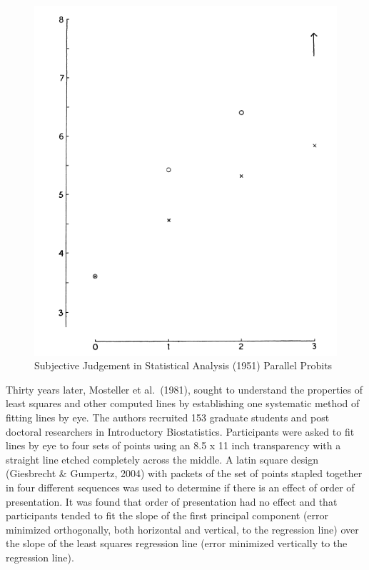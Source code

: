 \documentclass[print]{nuthesis}
\begin{document}
\begin{figure}[tbp]

{\centering \includegraphics[width=0.5\linewidth,]{images/subjective-judgement-plot} 

}

\caption{Subjective Judgement in Statistical Analysis (1951) Parallel Probits}\label{fig:subjective-judgement}
\end{figure}

Thirty years later, Mosteller et al.~(1981), sought to understand the properties of least squares and other computed lines by establishing one systematic method of fitting lines by eye.
The authors recruited 153 graduate students and post doctoral researchers in Introductory Biostatistics.
Participants were asked to fit lines by eye to four sets of points  using an 8.5 x 11 inch transparency with a straight line etched completely across the middle.
A latin square design (Giesbrecht \& Gumpertz, 2004) with packets of the set of points stapled together in four different sequences was used to determine if there is an effect of order of presentation.
It was found that order of presentation had no effect and that participants tended to fit the slope of the first principal component (error minimized orthogonally, both horizontal and vertical, to the regression line) over the slope of the least squares regression line (error minimized vertically to the regression line).
\end{document}

